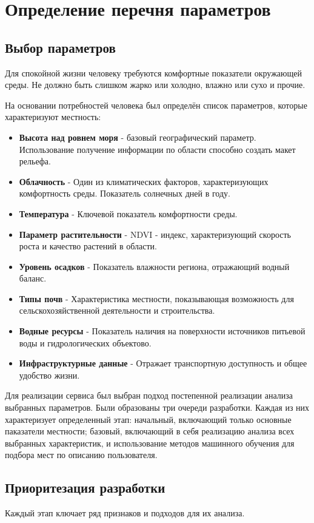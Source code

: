 \chapter{Определение перечня параметров}
\section{Выбор параметров}
Для спокойной жизни человеку требуются комфортные показатели окружающей среды. 
Не должно быть слишком жарко или холодно, влажно или сухо и прочие.

На основании потребностей человека был определён список параметров, которые характеризуют местность:
\begin{itemize}
	\item \textbf{Высота над ровнем моря} - базовый географический параметр. Использование получение информации по области способно создать макет рельефа.
	\item \textbf{Облачность} - Один из климатических факторов, характеризующих комфортность среды. Показатель солнечных дней в году.
	\item \textbf{Температура} - Ключевой показатель комфортности среды.
	\item \textbf{Параметр растительности} - NDVI - индекс, характеризующий скорость роста и качество растений в области.
	\item \textbf{Уровень осадков} - Показатель влажности региона, отражающий водный баланс.
	\item \textbf{Типы почв} - Характеристика местности, показывающая возможность для сельскохозяйственной деятельности и строительства.
	\item \textbf{Водные ресурсы} - Показатель наличия на поверхности источников питьевой воды и гидрологических объектово.
	\item \textbf{Инфраструктурные данные} - Отражает транспортную доступность и общее удобство жизни.
\end{itemize}

Для реализации сервиса был выбран подход постепенной реализации анализа выбранных параметров.
Были образованы три очереди разработки. 
Каждая из них характеризует определенный этап: начальный, включающий только основные паказатели местности;  базовый, включающий в себя реализацию анализа всех выбранных характеристик, и использование методов машинного обучения для подбора мест по описанию пользователя.
\newpage
\section{Приоритезация разработки}
Каждый этап ключает ряд признаков и подходов для их анализа.

